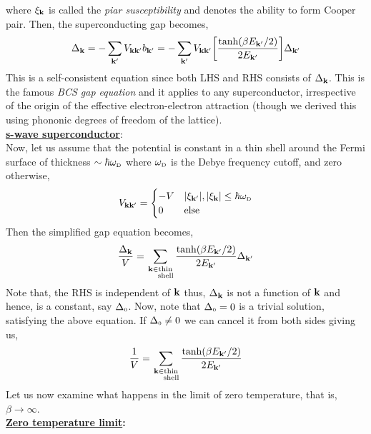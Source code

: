 \documentclass{article}
\newcommand{\tund}[1]{_{\text{\tiny #1}}}
\newcommand{\vk}{\vb{k}}
\newcommand{\vkd}{\vb{k}'}
\begin{document}
where $\xi_{\vk}$ is called the \textit{piar susceptibility} and denotes the ability to form Cooper pair. Then, the superconducting gap becomes, 
\begin{equation}
    \Delta_{\vk} = - \sum\limits_{\vkd}V_{\vk \vkd} b_{\vkd} = - \sum\limits_{\vkd}V_{\vk \vkd}\qty[\frac{\tanh(\beta E_{\vkd}/2)}{2E_{\vkd}}]\Delta_{\vkd}
    \label{eqn:gapeq}
\end{equation}
This is a self-consistent equation since both LHS and RHS consists of $\Delta_{\vk}$. This is the famous \textit{BCS gap equation} and it applies to any superconductor, irrespective of the origin of the effective electron-electron attraction (though we derived this using phononic degrees of freedom of the lattice).\\[0.2cm]
\textbf{\underline{s-wave superconductor}}:\\[0.2cm]
Now, let us assume that the potential is constant in a thin shell around the Fermi surface of thickness $\sim \hbar \omega\tund{D}$ where $\omega\tund{D}$ is the Debye frequency cutoff, and zero otherwise, 
\begin{equation}
    V_{\vk\vkd} = \begin{cases}
        -V & \abs{\xi_{\vkd}}, \abs{\xi_{\vk}}\leq \hbar \omega\tund{D}\\
        0 & \text{else}
    \end{cases}
\end{equation}
Then the simplified gap equation becomes,
\begin{equation}
    \frac{\Delta_{\vk}}{V} = \sum\limits_{\substack{\vk \in \text{thin}\\\text{\ \ \ \ shell}}} \frac{\tanh(\beta E_{\vkd}/2)}{2E_{\vkd}}\Delta_{\vkd}
\end{equation}
Note that, the RHS is independent of $\vk$ thus, $\Delta_{\vk}$ is not a function of $\vk$ and hence, is a constant, say $\Delta\tund{0}$. Now, note that $\Delta\tund{0}=0$ is a trivial solution, satisfying the above equation. If $\Delta\tund{0}\neq 0$ we can cancel it from both sides giving us, 
\begin{equation}
    \frac{1}{V} = \sum\limits_{\substack{\vk \in \text{thin}\\\text{\ \ \ \ shell}}} \frac{\tanh(\beta E_{\vkd}/2)}{2E_{\vkd}}
\end{equation}
Let us now examine what happens in the limit of zero temperature, that is, $\beta\to \infty$.\\[0.2cm]
\textbf{\underline{Zero temperature limit}:}\\[0.2cm]
\end{document}
